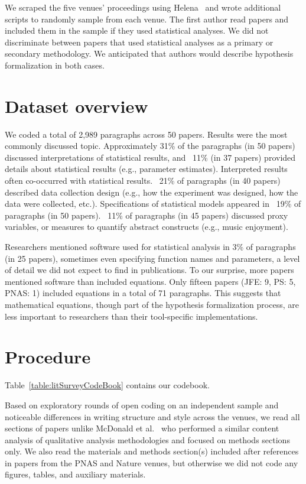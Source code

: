 We scraped the five venues' proceedings using Helena~\cite{chasins2018rousillon}
and wrote additional scripts to randomly sample from each venue. The first
author read papers and included them in the sample if they used statistical
analyses. We did not discriminate between papers that used statistical analyses
as a primary or secondary methodology. We anticipated that authors would
describe hypothesis formalization in both cases.

\section{Dataset overview}
We coded a total of 2,989 paragraphs across 50 papers. Results were the most
commonly discussed topic. Approximately 31\% of the paragraphs (in 50 papers)
discussed interpretations of statistical results, and ~11\% (in 37 papers)
provided details about statistical results (e.g., parameter estimates).
Interpreted results often co-occurred with statistical results. ~21\% of
paragraphs (in 40 papers) described data collection design (e.g., how the
experiment was designed, how the data were collected, etc.). Specifications of
statistical models appeared in ~19\% of paragraphs (in 50 papers). ~11\% of
paragraphs (in 45 papers) discussed proxy variables, or measures to quantify
abstract constructs (e.g., music enjoyment). 

Researchers mentioned software used for statistical analysis in 3\% of
paragraphs (in 25 papers), sometimes even specifying function names and
parameters, a level of detail we did not expect to find in publications. To our
surprise, more papers mentioned software than included equations. Only fifteen
papers (JFE: 9, PS: 5, PNAS: 1) included equations in a total of 71 paragraphs.
This suggests that mathematical equations, though part of the hypothesis
formalization process, are less important to researchers than their
tool-specific implementations.

\section{Procedure} \label{appendix:contentAnalysisProcedure}
Table~\ref{table:litSurveyCodeBook} contains our codebook.

Based on exploratory rounds of open coding on an independent sample and
noticeable differences in writing structure and style across the venues, we read
all sections of papers unlike McDonald et al.~\cite{mcdonald2019reliability} who
performed a similar content analysis of qualitative analysis methodologies and
focused on methods sections only. We also read the materials and methods section(s)
included after references in papers from the PNAS and Nature venues, but
otherwise we did not code any figures, tables, and auxiliary materials. 

